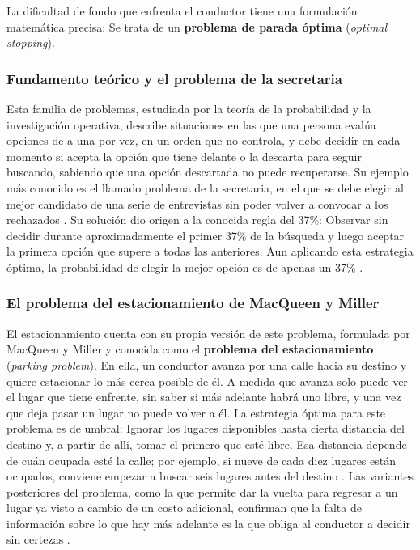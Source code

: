 La dificultad de fondo que enfrenta el conductor tiene una formulación matemática precisa: Se trata de un \textbf{problema de parada óptima} (\textit{optimal stopping}).

\subsubsection{Fundamento teórico y el problema de la secretaria}

Esta familia de problemas, estudiada por la teoría de la probabilidad y la investigación operativa, describe situaciones en las que una persona evalúa opciones de a una por vez, en un orden que no controla, y debe decidir en cada momento si acepta la opción que tiene delante o la descarta para seguir buscando, sabiendo que una opción descartada no puede recuperarse. Su ejemplo más conocido es el llamado problema de la secretaria, en el que se debe elegir al mejor candidato de una serie de entrevistas sin poder volver a convocar a los rechazados \autocite{ferguson1989}. Su solución dio origen a la conocida regla del 37\%: Observar sin decidir durante aproximadamente el primer 37\% de la búsqueda y luego aceptar la primera opción que supere a todas las anteriores. Aun aplicando esta estrategia óptima, la probabilidad de elegir la mejor opción es de apenas un 37\% \autocite{christian2016}.

\subsubsection{El problema del estacionamiento de MacQueen y Miller}

El estacionamiento cuenta con su propia versión de este problema, formulada por MacQueen y Miller \autocite{macqueen1960} y conocida como el \textbf{problema del estacionamiento} (\textit{parking problem}). En ella, un conductor avanza por una calle hacia su destino y quiere estacionar lo más cerca posible de él. A medida que avanza solo puede ver el lugar que tiene enfrente, sin saber si más adelante habrá uno libre, y una vez que deja pasar un lugar no puede volver a él. La estrategia óptima para este problema es de umbral: Ignorar los lugares disponibles hasta cierta distancia del destino y, a partir de allí, tomar el primero que esté libre. Esa distancia depende de cuán ocupada esté la calle; por ejemplo, si nueve de cada diez lugares están ocupados, conviene empezar a buscar seis lugares antes del destino \autocite{fergusonstopping}. Las variantes posteriores del problema, como la que permite dar la vuelta para regresar a un lugar ya visto a cambio de un costo adicional, confirman que la falta de información sobre lo que hay más adelante es la que obliga al conductor a decidir sin certezas \autocite{tamaki1988}.

